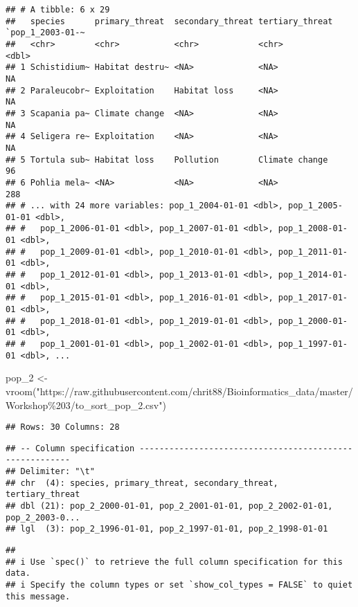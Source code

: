 \documentclass[
]{article}
\newenvironment{Shaded}{\begin{snugshade}}{\end{snugshade}}
\newcommand{\FunctionTok}[1]{\textcolor[rgb]{0.00,0.00,0.00}{#1}}
\newcommand{\NormalTok}[1]{#1}
\newcommand{\OtherTok}[1]{\textcolor[rgb]{0.56,0.35,0.01}{#1}}
\newcommand{\StringTok}[1]{\textcolor[rgb]{0.31,0.60,0.02}{#1}}
\begin{document}
\begin{verbatim}
## # A tibble: 6 x 29
##   species      primary_threat  secondary_threat tertiary_threat `pop_1_2003-01-~
##   <chr>        <chr>           <chr>            <chr>                      <dbl>
## 1 Schistidium~ Habitat destru~ <NA>             <NA>                          NA
## 2 Paraleucobr~ Exploitation    Habitat loss     <NA>                          NA
## 3 Scapania pa~ Climate change  <NA>             <NA>                          NA
## 4 Seligera re~ Exploitation    <NA>             <NA>                          NA
## 5 Tortula sub~ Habitat loss    Pollution        Climate change                96
## 6 Pohlia mela~ <NA>            <NA>             <NA>                         288
## # ... with 24 more variables: pop_1_2004-01-01 <dbl>, pop_1_2005-01-01 <dbl>,
## #   pop_1_2006-01-01 <dbl>, pop_1_2007-01-01 <dbl>, pop_1_2008-01-01 <dbl>,
## #   pop_1_2009-01-01 <dbl>, pop_1_2010-01-01 <dbl>, pop_1_2011-01-01 <dbl>,
## #   pop_1_2012-01-01 <dbl>, pop_1_2013-01-01 <dbl>, pop_1_2014-01-01 <dbl>,
## #   pop_1_2015-01-01 <dbl>, pop_1_2016-01-01 <dbl>, pop_1_2017-01-01 <dbl>,
## #   pop_1_2018-01-01 <dbl>, pop_1_2019-01-01 <dbl>, pop_1_2000-01-01 <dbl>,
## #   pop_1_2001-01-01 <dbl>, pop_1_2002-01-01 <dbl>, pop_1_1997-01-01 <dbl>, ...
\end{verbatim}

\begin{Shaded}
\begin{Highlighting}[]
\NormalTok{pop\_2 }\OtherTok{\textless{}{-}} \FunctionTok{vroom}\NormalTok{(}\StringTok{"https://raw.githubusercontent.com/chrit88/Bioinformatics\_data/master/Workshop\%203/to\_sort\_pop\_2.csv"}\NormalTok{)}
\end{Highlighting}
\end{Shaded}

\begin{verbatim}
## Rows: 30 Columns: 28
\end{verbatim}

\begin{verbatim}
## -- Column specification --------------------------------------------------------
## Delimiter: "\t"
## chr  (4): species, primary_threat, secondary_threat, tertiary_threat
## dbl (21): pop_2_2000-01-01, pop_2_2001-01-01, pop_2_2002-01-01, pop_2_2003-0...
## lgl  (3): pop_2_1996-01-01, pop_2_1997-01-01, pop_2_1998-01-01
\end{verbatim}

\begin{verbatim}
## 
## i Use `spec()` to retrieve the full column specification for this data.
## i Specify the column types or set `show_col_types = FALSE` to quiet this message.
\end{verbatim}
\end{document}
